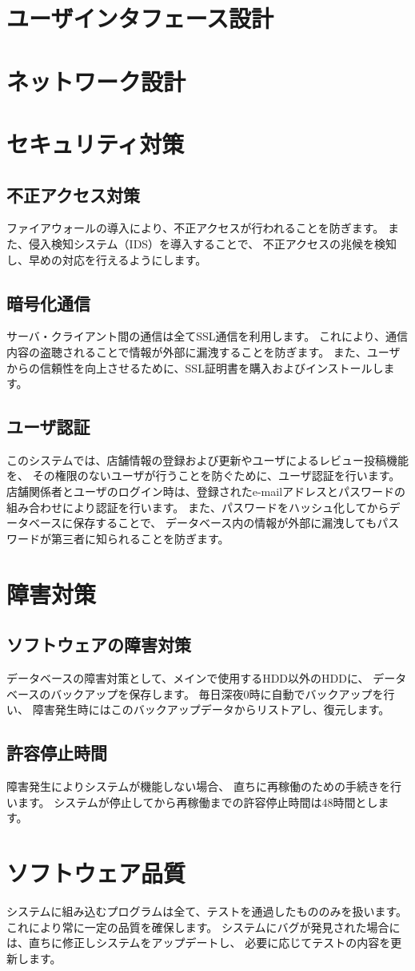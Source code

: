 \documentclass[a4j,titlepage]{jarticle}
\begin{document}
\section{ユーザインタフェース設計}

\section{ネットワーク設計}

\section{セキュリティ対策}
\subsection{不正アクセス対策}
ファイアウォールの導入により、不正アクセスが行われることを防ぎます。
また、侵入検知システム（IDS）を導入することで、
不正アクセスの兆候を検知し、早めの対応を行えるようにします。
\subsection{暗号化通信}
サーバ・クライアント間の通信は全てSSL通信を利用します。
これにより、通信内容の盗聴されることで情報が外部に漏洩することを防ぎます。
また、ユーザからの信頼性を向上させるために、SSL証明書を購入およびインストールします。
\subsection{ユーザ認証}
このシステムでは、店舗情報の登録および更新やユーザによるレビュー投稿機能を、
その権限のないユーザが行うことを防ぐために、ユーザ認証を行います。
店舗関係者とユーザのログイン時は、登録されたe-mailアドレスとパスワードの組み合わせにより認証を行います。
また、パスワードをハッシュ化してからデータベースに保存することで、
データベース内の情報が外部に漏洩してもパスワードが第三者に知られることを防ぎます。

\section{障害対策}
\subsection{ソフトウェアの障害対策}
データベースの障害対策として、メインで使用するHDD以外のHDDに、
データベースのバックアップを保存します。
毎日深夜0時に自動でバックアップを行い、
障害発生時にはこのバックアップデータからリストアし、復元します。
\subsection{許容停止時間}
障害発生によりシステムが機能しない場合、
直ちに再稼働のための手続きを行います。
システムが停止してから再稼働までの許容停止時間は48時間とします。

\section{ソフトウェア品質}
システムに組み込むプログラムは全て、テストを通過したもののみを扱います。
これにより常に一定の品質を確保します。
システムにバグが発見された場合には、直ちに修正しシステムをアップデートし、
必要に応じてテストの内容を更新します。
\end{document}
